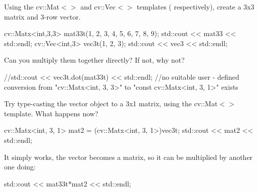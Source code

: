 \begin{DoxyEnumerate}
\item Using the {\ttfamily cv\+::\+Mat$<$$>$} and {\ttfamily cv\+::\+Vec$<$$>$} templates ( respectively), create a 3x3 matrix and 3-\/row vector. 
\begin{DoxyCodeInclude}
    cv::Matx<int,3,3> mat33t(1, 2, 3, 4, 5, 6, 7, 8, 9);
    std::cout << mat33 << std::endl;
    cv::Vec<int,3> vec3t(1, 2, 3);
    std::cout << vec3 << std::endl; 
\end{DoxyCodeInclude}

\item Can you multiply them together directly? If not, why not? 
\begin{DoxyCodeInclude}
    \textcolor{comment}{//std::cout << vec3t.dot(mat33t) << std::endl;}
    \textcolor{comment}{//no suitable user - defined conversion from "cv::Matx<int, 3, 3>" to "const cv::Matx<int, 3, 1>"
       exists}
\end{DoxyCodeInclude}

\item Try type-\/casting the vector object to a 3x1 matrix, using the {\ttfamily cv\+::\+Mat$<$$>$} template. What happens now? 
\begin{DoxyCodeInclude}
    cv::Matx<int, 3, 1> mat2 = (cv::Matx<int, 3, 1>)vec3t;
    std::cout << mat2 << std::endl;
\end{DoxyCodeInclude}
It simply works, the vector becomes a matrix, so it can be multiplied by another one doing\+: 
\begin{DoxyCodeInclude}
    std::cout << mat33t*mat2 << std::endl;
\end{DoxyCodeInclude}

\end{DoxyEnumerate}